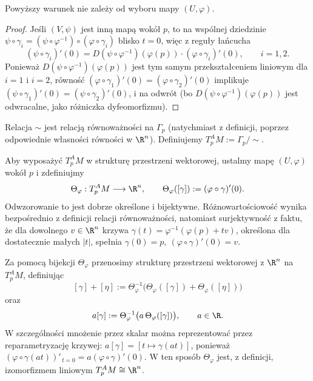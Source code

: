 \begin{fakt}
Powyższy warunek nie zależy od wyboru mapy $(U,\varphi)$.
\end{fakt}
\begin{proof}
Jeśli $(V,\psi)$ jest inną mapą wokół $p$, to na wspólnej dziedzinie $\psi\circ\gamma_i=
(\psi\circ\varphi^{-1})\circ(\varphi\circ\gamma_i)$ blisko $t=0$, więc z reguły łańcucha
\[
(\psi\circ\gamma_i)'(0)=D(\psi\circ\varphi^{-1})(\varphi(p))\cdot(\varphi\circ\gamma_i)'(0),
\qquad i=1,2.
\]
Ponieważ $D(\psi\circ\varphi^{-1})(\varphi(p))$ jest tym samym przekształceniem liniowym
dla $i=1$ i $i=2$, równość $(\varphi\circ\gamma_1)'(0)=(\varphi\circ\gamma_2)'(0)$
implikuje $(\psi\circ\gamma_1)'(0)=(\psi\circ\gamma_2)'(0)$, i na odwrót (bo
$D(\psi\circ\varphi^{-1})(\varphi(p))$ jest odwracalne, jako różniczka dyfeomorfizmu).
\end{proof}

Relacja $\sim$ jest relacją równoważności na $\Gamma_p$ (natychmiast z definicji, poprzez
odpowiednie własności równości w $\R^n$). Definiujemy $T_p^AM:=\Gamma_p/\!\sim$.

Aby wyposażyć $T_p^AM$ w strukturę przestrzeni wektorowej, ustalmy mapę
$(U,\varphi)$ wokół $p$ i zdefiniujmy
\[
\Theta_\varphi:T_p^AM\longrightarrow\R^n,
\qquad
\Theta_\varphi([\gamma]):=(\varphi\circ\gamma)'(0).
\]
Odwzorowanie to jest dobrze określone i bijektywne. Różnowartościowość
wynika bezpośrednio z definicji relacji równoważności, natomiast
surjektywność z faktu, że dla dowolnego $v\in\R^n$ krzywa $\gamma(t)=\varphi^{-1}(\varphi(p)+tv)$,
określona dla dostatecznie małych $|t|$, spełnia $\gamma(0)=p, \ (\varphi\circ\gamma)'(0)=v$.

Za pomocą bijekcji $\Theta_\varphi$ przenosimy strukturę przestrzeni
wektorowej z $\R^n$ na $T_p^AM$, definiując
\[
[\gamma]+[\eta]
:=
\Theta_\varphi^{-1}
\bigl(\Theta_\varphi([\gamma])+\Theta_\varphi([\eta])\bigr)
\]
oraz
\[
a[\gamma]
:=
\Theta_\varphi^{-1}
\bigl(a\,\Theta_\varphi([\gamma])\bigr),
\qquad a\in\R.
\]
W szczególności mnożenie przez skalar można reprezentować przez
reparametryzację krzywej: $a[\gamma]=[t\mapsto\gamma(at)]$,
ponieważ $(\varphi\circ\gamma(at))'_{\,t=0} = a(\varphi\circ\gamma)'(0)$.
W ten sposób $\Theta_\varphi$ jest, z definicji, izomorfizmem liniowym
$T_p^AM\cong\R^n$.


